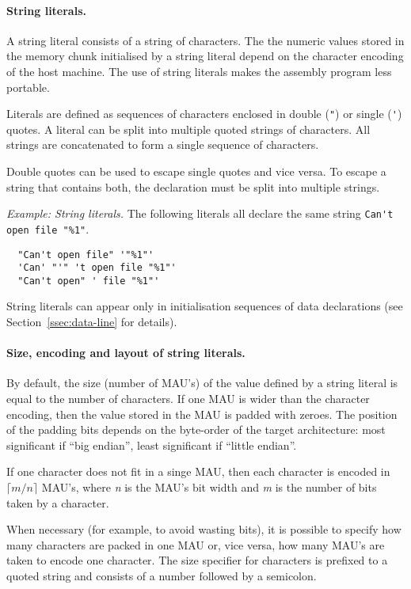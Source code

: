 \documentclass[twoside]{tceusermanual}
\begin{document}
\paragraph{String literals.}

A string literal consists of a string of characters. The the numeric values
stored in the memory chunk initialised by a string literal depend on the
character encoding of the host machine.
%
%
The use of string literals makes the assembly program less portable.

Literals are defined as sequences of characters enclosed in double
(\verb|"|) or single (\verb|'|) quotes. A literal can be split into multiple
quoted strings of characters. All strings are concatenated to form a single
sequence of characters.

Double quotes can be used to escape single quotes and vice versa. To escape
a string that contains both, the declaration must be split into multiple
strings.

\emph{Example: String literals.}
The following literals all declare the same string 
\verb|Can't open file "%1"|.
%
\begin{verbatim}
  "Can't open file" '"%1"'
  'Can' "'" 't open file "%1"'
  "Can't open" ' file "%1"'
\end{verbatim}

String literals can appear only in initialisation sequences of data
declarations (see Section~\ref{ssec:data-line} for details).

\paragraph{Size, encoding and layout of string literals.}
By default, the size (number of MAU's) of the value defined by a string
literal is equal to the number of characters. If one MAU is wider than the
character encoding, then the value stored in the MAU is padded with zeroes.
The position of the padding bits depends on the byte-order of the target
architecture: most significant if ``big endian'', least significant if
``little endian''.

If one character does not fit in a singe MAU, then each character is encoded
in $\lceil m/n \rceil$ MAU's, where \emph{n} is the MAU's bit width and
\emph{m} is the number of bits taken by a character.

When necessary (for example, to avoid wasting bits), it is possible to
specify how many characters are packed in one MAU or, vice versa, how many
MAU's are taken to encode one character.
%
The size specifier for characters is prefixed to a quoted string and
consists of a number followed by a semicolon.
\end{document}
